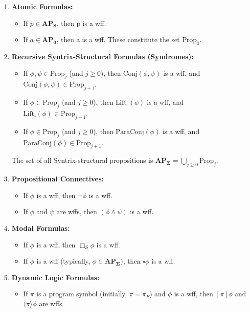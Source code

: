 \documentclass[
    12pt,              %
    a4paper,           %
    headings=normal,   %
    twoside=true,      %
    BCOR=8mm,          %
]{scrbook}
\newcommand{\BoxS}{\Box_S}
\newcommand{\BoxSyn}{\square}
\newcommand{\APS}{\mathbf{AP_S}}
\newcommand{\APZero}{\mathbf{AP_0}}
\newcommand{\APSigma}{\mathbf{AP_{\Sigma}}}
\newcommand{\Propk}[1]{\text{Prop}_{#1}}
\begin{document}
\begin{enumerate}[label=\arabic*.]
    \item  \textbf{Atomic Formulas:}
        \begin{itemize}
            \item   If \(p \in \APS\), then p is a wff.
            \item   If \(a \in \APZero\), then a is a wff. These constitute the set \(\Propk{0}\).
        \end{itemize}

    \item  \textbf{Recursive Syntrix-Structural Formulas (Syndromes):}
        \begin{itemize}
            \item   If \(\phi, \psi \in \Propk{j}\) (and \(j \ge 0\)), then \(\text{Conj}(\phi, \psi)\) is a wff, and \(\text{Conj}(\phi, \psi) \in \Propk{j+1}\).
            \item   If \(\phi \in \Propk{j}\) (and \(j \ge 0\)), then \(\text{Lift}_\BoxSyn(\phi)\) is a wff, and \(\text{Lift}_\BoxSyn(\phi) \in \Propk{j+1}\).
            \item   If \(\phi \in \Propk{j}\) (and \(j \ge 0\)), then \(\text{ParaConj}(\phi)\) is a wff, and \(\text{ParaConj}(\phi) \in \Propk{j+1}\).
        \end{itemize}
        The set of all Syntrix-structural propositions is \(\APSigma = \bigcup_{j \ge 0} \Propk{j}\).

    \item  \textbf{Propositional Connectives:}
        \begin{itemize}
            \item   If \(\phi\) is a wff, then \(\neg \phi\) is a wff.
            \item   If \(\phi\) and \(\psi\) are wffs, then \((\phi \land \psi)\) is a wff.
        \end{itemize}

    \item  \textbf{Modal Formulas:}
        \begin{itemize}
            \item   If \(\phi\) is a wff, then \(\BoxS \phi\) is a wff.
            \item   If \(\phi\) is a wff (typically, \(\phi \in \APSigma\)), then \(\BoxSyn \phi\) is a wff.
        \end{itemize}

    \item  \textbf{Dynamic Logic Formulas:}
        \begin{itemize}
            \item   If \(\pi\) is a program symbol (initially, \(\pi = \pi_F\)) and \(\phi\) is a wff, then \([\pi]\phi\) and \(\langle\pi\rangle\phi\) are wffs.
        \end{itemize}
\end{enumerate}
\end{document}
